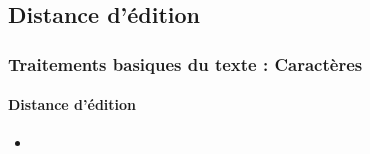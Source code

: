 \documentclass[xcolor=table]{beamer}
\begin{document}
\begin{frame}
%	
%	
%	
%	
%	
%	
%	
%	
%	
%	
%	
%	

\end{frame}

\subsection{Distance d'édition}

\begin{frame}
\frametitle{Traitements basiques du texte : Caractères}
\framesubtitle{Distance d'édition}

\begin{itemize}
	\item 
\end{itemize}

\end{frame}
\end{document}
